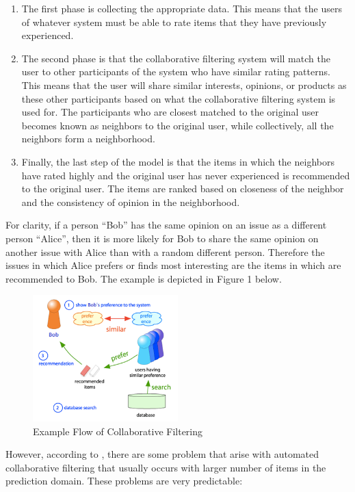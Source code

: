 \documentclass[conference]{IEEEtran}
\begin{document}
\begin{enumerate}
  \item The first phase is collecting the appropriate data. This means that the users of whatever system must be able to rate
        items that they have previously experienced. 
  \item The second phase is that the collaborative filtering system will match the user to other participants of the system who
        have similar rating patterns.  This means that the user will share similar interests, opinions, or products as these 
        other participants based on what the collaborative filtering system is used for.  The participants who are closest 
        matched to the original user becomes known as neighbors to the original user, while collectively, all the neighbors 
        form a neighborhood.
  \item Finally, the last step of the model is that the items in which the neighbors have rated highly and the original user has
        never experienced is recommended to the original user.  The items are ranked based on closeness of the neighbor and the 
        consistency of opinion in the neighborhood.
\end{enumerate}

For clarity, if a person “Bob” has the same opinion on an issue as a different person “Alice”, then it is more likely for Bob to share the same opinion on another issue with Alice than with a random different person.  Therefore the issues in which Alice prefers or finds most interesting are the items in which are recommended to Bob.  The example is depicted in Figure 1 below.

\begin{figure}[h]
\centering
\includegraphics[width=0.5\textwidth]{image/cf_example_flow}
\caption{Example Flow of Collaborative Filtering}
\end{figure}

However, according to \cite{ClusteringItems}, there are some problem that arise with automated collaborative filtering that usually occurs with larger number of items in the prediction domain. These problems are very predictable:
\end{document}
